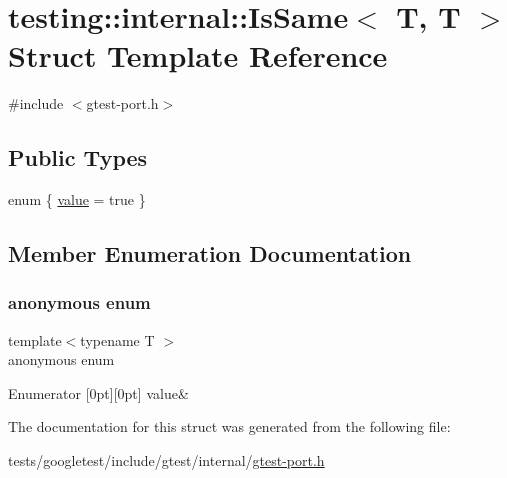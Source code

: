 \hypertarget{structtesting_1_1internal_1_1IsSame_3_01T_00_01T_01_4}{}\section{testing\+:\+:internal\+:\+:Is\+Same$<$ T, T $>$ Struct Template Reference}
\label{structtesting_1_1internal_1_1IsSame_3_01T_00_01T_01_4}


{\ttfamily \#include $<$gtest-\/port.\+h$>$}

\subsection*{Public Types}
\begin{DoxyCompactItemize}
\item 
enum \{ \hyperlink{structtesting_1_1internal_1_1IsSame_3_01T_00_01T_01_4_a4f43bdb63adfd73e0a8cace4cc6368dea0bb1c61b491e4e13216a3f9e9cd24c69}{value} = true
 \}
\end{DoxyCompactItemize}


\subsection{Member Enumeration Documentation}
\mbox{\label{structtesting_1_1internal_1_1IsSame_3_01T_00_01T_01_4_a4f43bdb63adfd73e0a8cace4cc6368de}} 
\subsubsection{\texorpdfstring{anonymous enum}{anonymous enum}}
{\footnotesize\ttfamily template$<$typename T $>$ \\
anonymous enum}

\begin{DoxyEnumFields}{Enumerator}
[0pt][0pt]{}\mbox{\label{structtesting_1_1internal_1_1IsSame_3_01T_00_01T_01_4_a4f43bdb63adfd73e0a8cace4cc6368dea0bb1c61b491e4e13216a3f9e9cd24c69}} 
value&\\
\hline

\end{DoxyEnumFields}


The documentation for this struct was generated from the following file\+:\begin{DoxyCompactItemize}
\item 
tests/googletest/include/gtest/internal/\hyperlink{gtest-port_8h}{gtest-\/port.\+h}\end{DoxyCompactItemize}
